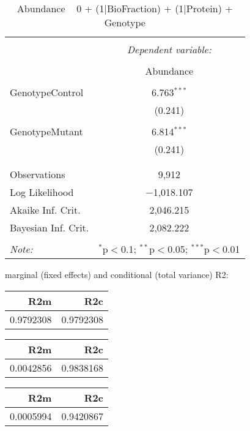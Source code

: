 \documentclass[11pt]{report}
\begin{document}
\begin{table}[!htbp] \centering 
  \caption{Abundance ~ 0 + (1|BioFraction) + (1|Protein) + Genotype} 
  \label{} 
\begin{tabular}{@{\extracolsep{5pt}}lc} 
\\[-1.8ex]\hline 
\hline \\[-1.8ex] 
 & \multicolumn{1}{c}{\textit{Dependent variable:}} \\ 
\cline{2-2} 
\\[-1.8ex] & Abundance \\ 
\hline \\[-1.8ex] 
 GenotypeControl & 6.763$^{***}$ \\ 
  & (0.241) \\ 
  & \\ 
 GenotypeMutant & 6.814$^{***}$ \\ 
  & (0.241) \\ 
  & \\ 
\hline \\[-1.8ex] 
Observations & 9,912 \\ 
Log Likelihood & $-$1,018.107 \\ 
Akaike Inf. Crit. & 2,046.215 \\ 
Bayesian Inf. Crit. & 2,082.222 \\ 
\hline 
\hline \\[-1.8ex] 
\textit{Note:}  & \multicolumn{1}{r}{$^{*}$p$<$0.1; $^{**}$p$<$0.05; $^{***}$p$<$0.01} \\ 
\end{tabular} 
\end{table} 
marginal (fixed effects) and conditional (total variance) R2:

\begin{tabular}{r|r}
\hline
R2m & R2c\\
\hline
0.9792308 & 0.9792308\\
\hline
\end{tabular}

\begin{tabular}{r|r}
\hline
R2m & R2c\\
\hline
0.0042856 & 0.9838168\\
\hline
\end{tabular}

\begin{tabular}{r|r}
\hline
R2m & R2c\\
\hline
0.0005994 & 0.9420867\\
\hline
\end{tabular}
\end{document}
